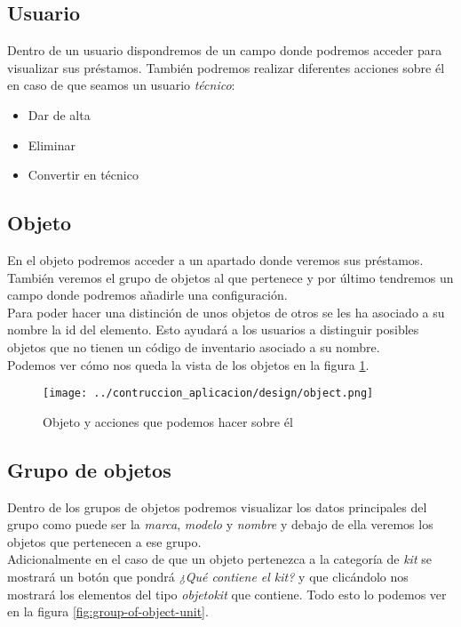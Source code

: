 \subsection{Usuario}
Dentro de un usuario dispondremos de un campo donde podremos acceder para visualizar sus préstamos. También podremos realizar diferentes acciones sobre él en caso de que seamos un usuario \textit{técnico}:
\begin{itemize}
    \item Dar de alta
    \item Eliminar
    \item Convertir en técnico
\end{itemize}

\subsection{Objeto}
En el objeto podremos acceder a un apartado donde veremos sus préstamos. También veremos el grupo de objetos al que pertenece y por último tendremos un campo donde podremos añadirle una configuración.
\\Para poder hacer una distinción de unos objetos de otros se les ha asociado a su nombre la id del elemento. Esto ayudará a los usuarios a distinguir posibles objetos que no tienen un código de inventario asociado a su nombre.
\\Podemos ver cómo nos queda la vista de los objetos en la figura \ref{fig:object-unit}.

\begin{figure}[h]
    \centering
    \texttt{[image: ../contruccion\_aplicacion/design/object.png]}
    \caption{Objeto y acciones que podemos hacer sobre él}\label{fig:object-unit}
\end{figure}

\subsection{Grupo de objetos}
Dentro de los grupos de objetos podremos visualizar los datos principales del grupo como puede ser la \textit{marca}, \textit{modelo} y \textit{nombre} y debajo de ella veremos los objetos que pertenecen a ese grupo.
\\Adicionalmente en el caso de que un objeto pertenezca a la categoría de \textit{kit} se mostrará un botón que pondrá \textit{¿Qué contiene el kit?} y que clicándolo nos mostrará los elementos del tipo \textit{objetokit} que contiene. Todo esto lo podemos ver en la figura \ref{fig:group-of-object-unit}.


